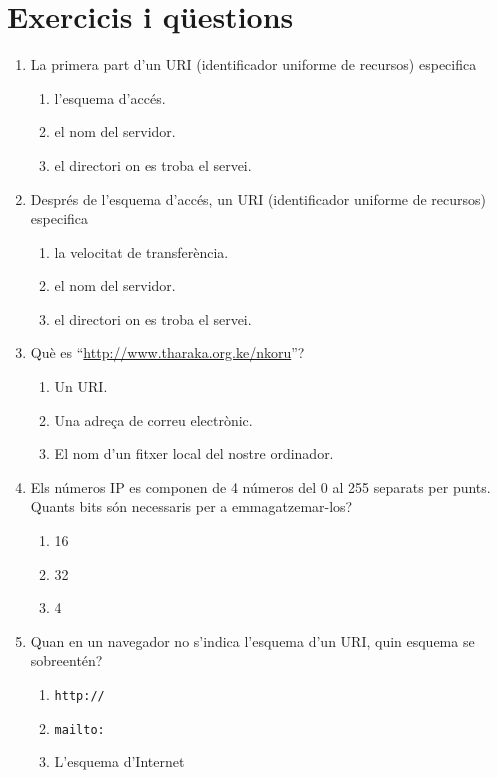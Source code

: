 \section{Exercicis i qüestions}
\begin{enumerate}

\item La primera part d'un URI (identificador uniforme de recursos)
especifica
     \begin{enumerate}
     \item l'esquema d'accés.
     \item el nom del servidor.
     \item el directori on es troba el servei.
     \end{enumerate}


\item Després de l'esquema d'accés, un URI (identificador uniforme de
  recursos) especifica
     \begin{enumerate}
     \item la velocitat de transferència.
     \item el nom del servidor.
     \item el directori on es troba el servei.
     \end{enumerate}

\item Què es ``\url{http://www.tharaka.org.ke/nkoru}''?
      \begin{enumerate}     
      \item Un URI.
      \item Una adreça de correu electrònic.
      \item El nom d'un fitxer local del nostre ordinador.
      \end{enumerate}

\item Els números IP es componen de 4 números del 0 al 255 separats
  per punts. Quants bits són necessaris per a emmagatzemar-los?
\begin{enumerate}
\item 16
\item 32
\item 4
\end{enumerate} 


\item 
   Quan en un navegador no s'indica l'esquema d'un URI, quin
   esquema se sobreentén?
   
\begin{enumerate}
\item \verb|http://|
\item \verb|mailto:|
\item L'esquema d'Internet
\end{enumerate}


\end{enumerate}
